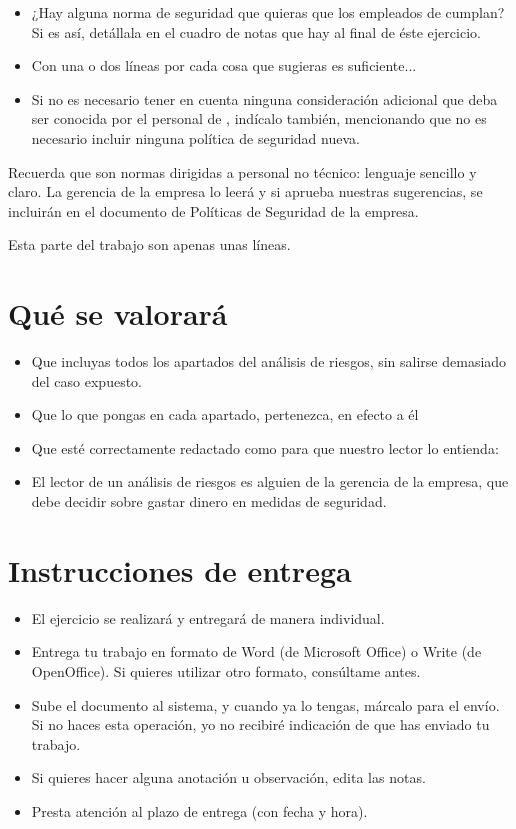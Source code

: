 \begin{itemize}
\item ¿Hay alguna norma de seguridad que quieras que los empleados de {\nombreempresa} cumplan? Si es así, detállala en  el cuadro de notas que hay al final de éste ejercicio.
  
\item Con una o dos líneas por cada cosa que sugieras es   suficiente...
  
\item Si no es necesario tener en cuenta ninguna consideración adicional que deba ser conocida por el personal
  de {\nombreempresa}, indícalo también, mencionando que no es necesario incluir ninguna política de seguridad nueva.
\end{itemize}
Recuerda que son normas dirigidas a personal no técnico: lenguaje sencillo y claro. La gerencia de la empresa lo leerá y si aprueba nuestras sugerencias, se incluirán en el documento de Políticas de Seguridad de la empresa.

Esta parte del trabajo son apenas unas líneas.

\section{Qué se valorará}
\begin{itemize}
\item Que incluyas todos los apartados del análisis de riesgos, sin salirse demasiado del caso expuesto.
\item Que lo que pongas en cada apartado, pertenezca, en efecto a él
\item Que esté correctamente redactado como para que nuestro lector lo entienda:
\item El lector de un análisis de riesgos es alguien de la gerencia de la empresa, que debe decidir sobre gastar dinero en medidas de seguridad.
\end{itemize}

\section{Instrucciones de entrega}
\begin{itemize}
\item El ejercicio se realizará y entregará de manera individual.
\item Entrega tu trabajo en formato de Word (de Microsoft Office) o Write (de OpenOffice). Si quieres utilizar otro formato, consúltame antes.
\item Sube el documento al sistema, y cuando ya lo tengas, márcalo para el envío. Si no haces esta operación, yo no recibiré indicación de que has enviado tu trabajo.
\item Si quieres hacer alguna anotación u observación, edita las notas.
\item Presta atención al plazo de entrega (con fecha y hora).
\end{itemize}

